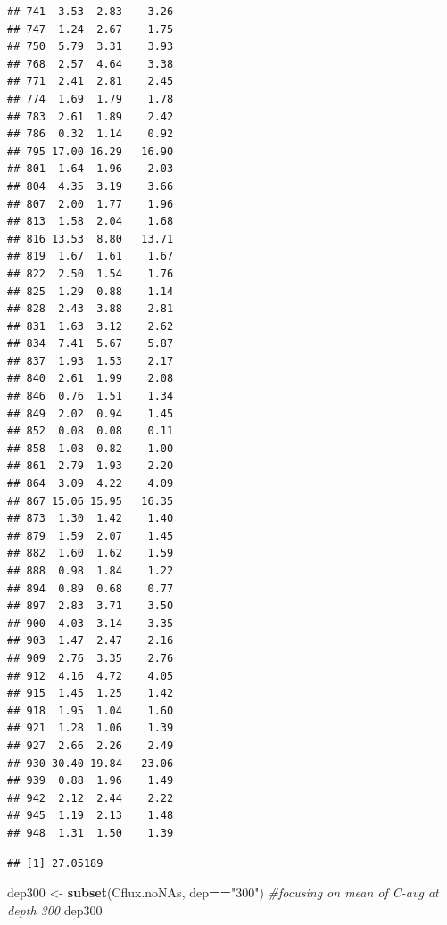 \documentclass[]{article}
\newenvironment{Shaded}{\begin{snugshade}}{\end{snugshade}}
\newcommand{\CommentTok}[1]{\textcolor[rgb]{0.56,0.35,0.01}{\textit{#1}}}
\newcommand{\DataTypeTok}[1]{\textcolor[rgb]{0.13,0.29,0.53}{#1}}
\newcommand{\KeywordTok}[1]{\textcolor[rgb]{0.13,0.29,0.53}{\textbf{#1}}}
\newcommand{\NormalTok}[1]{#1}
\newcommand{\OperatorTok}[1]{\textcolor[rgb]{0.81,0.36,0.00}{\textbf{#1}}}
\newcommand{\StringTok}[1]{\textcolor[rgb]{0.31,0.60,0.02}{#1}}
\begin{document}
\begin{verbatim}
## 741  3.53  2.83    3.26
## 747  1.24  2.67    1.75
## 750  5.79  3.31    3.93
## 768  2.57  4.64    3.38
## 771  2.41  2.81    2.45
## 774  1.69  1.79    1.78
## 783  2.61  1.89    2.42
## 786  0.32  1.14    0.92
## 795 17.00 16.29   16.90
## 801  1.64  1.96    2.03
## 804  4.35  3.19    3.66
## 807  2.00  1.77    1.96
## 813  1.58  2.04    1.68
## 816 13.53  8.80   13.71
## 819  1.67  1.61    1.67
## 822  2.50  1.54    1.76
## 825  1.29  0.88    1.14
## 828  2.43  3.88    2.81
## 831  1.63  3.12    2.62
## 834  7.41  5.67    5.87
## 837  1.93  1.53    2.17
## 840  2.61  1.99    2.08
## 846  0.76  1.51    1.34
## 849  2.02  0.94    1.45
## 852  0.08  0.08    0.11
## 858  1.08  0.82    1.00
## 861  2.79  1.93    2.20
## 864  3.09  4.22    4.09
## 867 15.06 15.95   16.35
## 873  1.30  1.42    1.40
## 879  1.59  2.07    1.45
## 882  1.60  1.62    1.59
## 888  0.98  1.84    1.22
## 894  0.89  0.68    0.77
## 897  2.83  3.71    3.50
## 900  4.03  3.14    3.35
## 903  1.47  2.47    2.16
## 909  2.76  3.35    2.76
## 912  4.16  4.72    4.05
## 915  1.45  1.25    1.42
## 918  1.95  1.04    1.60
## 921  1.28  1.06    1.39
## 927  2.66  2.26    2.49
## 930 30.40 19.84   23.06
## 939  0.88  1.96    1.49
## 942  2.12  2.44    2.22
## 945  1.19  2.13    1.48
## 948  1.31  1.50    1.39
\end{verbatim}

\begin{Shaded}
\end{Shaded}

\begin{verbatim}
## [1] 27.05189
\end{verbatim}

\begin{Shaded}
\begin{Highlighting}[]
\NormalTok{dep300 <-}\StringTok{ }\KeywordTok{subset}\NormalTok{(Cflux.noNAs, dep}\OperatorTok{==}\StringTok{"300"}\NormalTok{) }\CommentTok{#focusing on mean of C-avg at depth 300}
\NormalTok{dep300}
\end{Highlighting}
\end{Shaded}
\end{document}
